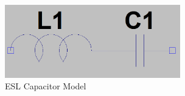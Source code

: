 \begin{figure}
\includegraphics[keepaspectratio=true,width=3in]{./figures/parameters/eslModel.png}
\centering
\caption{ESL Capacitor Model}
\label{eslModel}
\end{figure}
